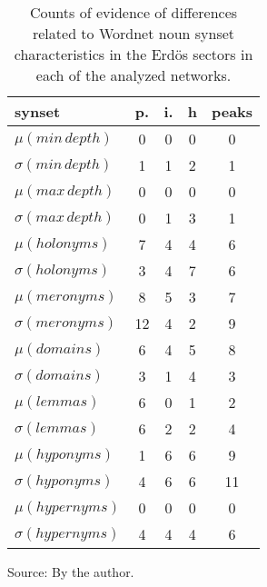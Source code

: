 \begin{table}[h!]
\begin{center}
\caption{Counts of evidence of differences related to Wordnet noun synset characteristics in the Erd\"os sectors in each of the analyzed networks.}
\begin{tabular}{| l || c | c | c || c |}\hline
{\bf synset} & {\bf p.} & {\bf i.} & {\bf h} & {\bf peaks} \\\hline\hline
$\mu(min\,depth)$ & 0  & 0  & 0  & 0 \\
$\sigma(min\,depth)$ & 1  & 1  & 2  & 1 \\\hline
$\mu(max\,depth)$ & 0  & 0  & 0  & 0 \\
$\sigma(max\,depth)$ & 0  & 1  & 3  & 1 \\\hline
$\mu(holonyms)$ & 7  & 4  & 4  & 6 \\
$\sigma(holonyms)$ & 3  & 4  & 7  & 6 \\\hline
$\mu(meronyms)$ & 8  & 5  & 3  & 7 \\
$\sigma(meronyms)$ & 12  & 4  & 2  & 9 \\\hline
$\mu(domains)$ & 6  & 4  & 5  & 8 \\
$\sigma(domains)$ & 3  & 1  & 4  & 3 \\\hline
$\mu(lemmas)$ & 6  & 0  & 1  & 2 \\
$\sigma(lemmas)$ & 6  & 2  & 2  & 4 \\\hline
$\mu(hyponyms)$ & 1  & 6  & 6  & 9 \\
$\sigma(hyponyms)$ & 4  & 6  & 6  & 11 \\\hline
$\mu(hypernyms)$ & 0  & 0  & 0  & 0 \\
$\sigma(hypernyms)$ & 4  & 4  & 4  & 6 \\\hline
\end{tabular}
\begin{flushleft}\footnotesize
		Source: By the author.\
\end{flushleft}
\end{center}
\end{table}
